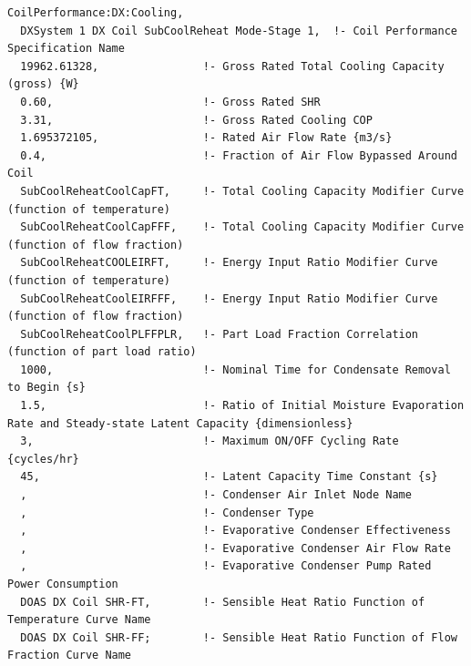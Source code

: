 \begin{lstlisting}
CoilPerformance:DX:Cooling,
  DXSystem 1 DX Coil SubCoolReheat Mode-Stage 1,  !- Coil Performance Specification Name
  19962.61328,                !- Gross Rated Total Cooling Capacity (gross) {W}
  0.60,                       !- Gross Rated SHR
  3.31,                       !- Gross Rated Cooling COP
  1.695372105,                !- Rated Air Flow Rate {m3/s}
  0.4,                        !- Fraction of Air Flow Bypassed Around Coil
  SubCoolReheatCoolCapFT,     !- Total Cooling Capacity Modifier Curve (function of temperature)
  SubCoolReheatCoolCapFFF,    !- Total Cooling Capacity Modifier Curve (function of flow fraction)
  SubCoolReheatCOOLEIRFT,     !- Energy Input Ratio Modifier Curve (function of temperature)
  SubCoolReheatCoolEIRFFF,    !- Energy Input Ratio Modifier Curve (function of flow fraction)
  SubCoolReheatCoolPLFFPLR,   !- Part Load Fraction Correlation (function of part load ratio)
  1000,                       !- Nominal Time for Condensate Removal to Begin {s}
  1.5,                        !- Ratio of Initial Moisture Evaporation Rate and Steady-state Latent Capacity {dimensionless}
  3,                          !- Maximum ON/OFF Cycling Rate {cycles/hr}
  45,                         !- Latent Capacity Time Constant {s}
  ,                           !- Condenser Air Inlet Node Name
  ,                           !- Condenser Type
  ,                           !- Evaporative Condenser Effectiveness
  ,                           !- Evaporative Condenser Air Flow Rate
  ,                           !- Evaporative Condenser Pump Rated Power Consumption
  DOAS DX Coil SHR-FT,        !- Sensible Heat Ratio Function of Temperature Curve Name
  DOAS DX Coil SHR-FF;        !- Sensible Heat Ratio Function of Flow Fraction Curve Name


\end{lstlisting}

